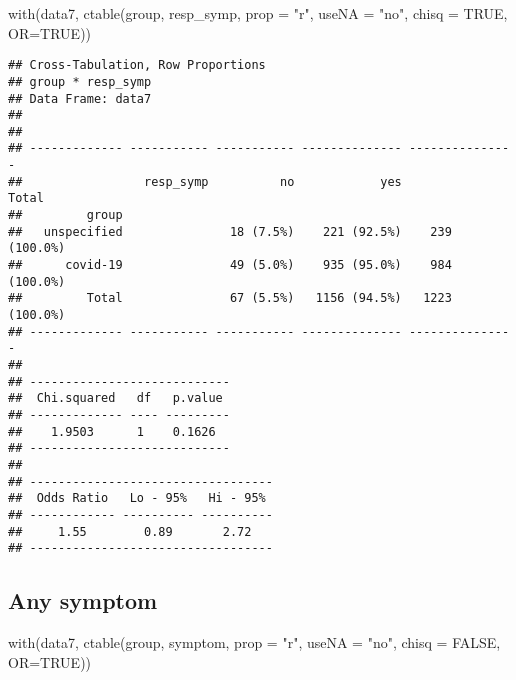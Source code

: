 \documentclass[
]{article}
\newenvironment{Shaded}{\begin{snugshade}}{\end{snugshade}}
\newcommand{\AttributeTok}[1]{\textcolor[rgb]{0.77,0.63,0.00}{#1}}
\newcommand{\ConstantTok}[1]{\textcolor[rgb]{0.00,0.00,0.00}{#1}}
\newcommand{\FunctionTok}[1]{\textcolor[rgb]{0.00,0.00,0.00}{#1}}
\newcommand{\NormalTok}[1]{#1}
\newcommand{\StringTok}[1]{\textcolor[rgb]{0.31,0.60,0.02}{#1}}
\begin{document}
\begin{Shaded}
\begin{Highlighting}[]
\FunctionTok{with}\NormalTok{(data7, }\FunctionTok{ctable}\NormalTok{(group, resp\_symp, }\AttributeTok{prop =} \StringTok{"r"}\NormalTok{, }\AttributeTok{useNA =} \StringTok{"no"}\NormalTok{, }\AttributeTok{chisq =} \ConstantTok{TRUE}\NormalTok{, }\AttributeTok{OR=}\ConstantTok{TRUE}\NormalTok{))}
\end{Highlighting}
\end{Shaded}

\begin{verbatim}
## Cross-Tabulation, Row Proportions  
## group * resp_symp  
## Data Frame: data7  
## 
## 
## ------------- ----------- ----------- -------------- ---------------
##                 resp_symp          no            yes           Total
##         group                                                       
##   unspecified               18 (7.5%)    221 (92.5%)    239 (100.0%)
##      covid-19               49 (5.0%)    935 (95.0%)    984 (100.0%)
##         Total               67 (5.5%)   1156 (94.5%)   1223 (100.0%)
## ------------- ----------- ----------- -------------- ---------------
## 
## ----------------------------
##  Chi.squared   df   p.value 
## ------------- ---- ---------
##    1.9503      1    0.1626  
## ----------------------------
## 
## ----------------------------------
##  Odds Ratio   Lo - 95%   Hi - 95% 
## ------------ ---------- ----------
##     1.55        0.89       2.72   
## ----------------------------------
\end{verbatim}

\hypertarget{any-symptom}{%
\subsection{Any symptom}\label{any-symptom}}

\begin{Shaded}
\begin{Highlighting}[]
\FunctionTok{with}\NormalTok{(data7, }\FunctionTok{ctable}\NormalTok{(group, symptom, }\AttributeTok{prop =} \StringTok{"r"}\NormalTok{, }\AttributeTok{useNA =} \StringTok{"no"}\NormalTok{, }\AttributeTok{chisq =} \ConstantTok{FALSE}\NormalTok{, }\AttributeTok{OR=}\ConstantTok{TRUE}\NormalTok{))}
\end{Highlighting}
\end{Shaded}
\end{document}
